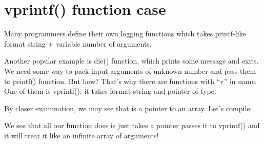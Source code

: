 \section{vprintf() function case}

Many programmers define their own logging functions which takes printf-like format string + 
variable number of arguments.

Another popular example is die() function, which prints some message and exits.
We need some way to pack input arguments of unknown number and pass them to printf() function.
But how?
That's why there are functions with ``v'' in name.
One of them is vprintf(): it takes format-string and pointer of  type:



By closer examination, we may see that  is a pointer to an array.
Let's compile:



We see that all our function does is just takes a pointer passes it to vprintf() and it will
treat it like an infinite array of arguments!


